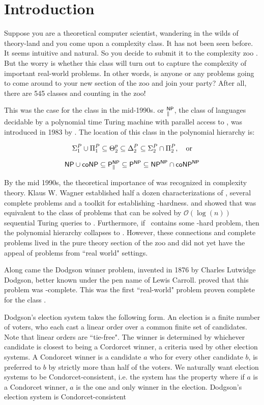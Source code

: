 \section{Introduction}\label{sec:intro}

    Suppose you are a theoretical computer scientist, wandering in the wilds
of theory-land and you come upon a complexity class.
It has not been seen before.
It seems intuitive and natural.
So you decide to submit it to the complexity zoo \citep{zoo}.
But the worry is whether this class will turn out to capture the complexity
of important real-world problems.
In other words, is anyone or any problems going to come around to your new
section of the zoo and join your party?
After all, there are 545 classes and counting
in the zoo!

This was the case for the class \tp in the mid-1990s.
\tp or $^{\mathsf{NP}}_{\parallel}$, the class of
languages decidable by a polynomial time Turing machine with parallel access to
\np, was introduced in 1983 by \citep{PZ83}.
The location of this class in the polynomial hierarchy is:


   $$\Sigma^{P}_{1} \cup \Pi^{P}_{1} \subseteq
    \Theta^{p}_2 \subseteq \Delta^{P}_2
    \subseteq \Sigma^{P}_{2} \cap \Pi^{P}_{2},~~~\text{or}$$

  $$\mathsf{NP} \cup \mathsf{coNP} \subseteq \mathsf{P}^{\mathsf{NP}}_{\parallel}
    \subseteq \mathsf{P}^{\mathsf{NP}} \subseteq \mathsf{NP}^{\mathsf{NP}} \cap \mathsf{coNP}^{\mathsf{NP}}$$


By the mid 1990s, the theoretical importance of \tp was recognized in complexity theory.
Klaus W. Wagner established half a dozen characterizations of \tp \citep{wag90},
several complete problems and a toolkit for establishing \tp-hardness.
\citet{hem87} and \citet{ksw87} showed that \tp was equivalent to the class of
problems that can be solved by $\mathcal{O}(\log(n))$ sequential Turing queries to \np.
Furthermore, if \np~contains some \tp-hard problem, then the polynomial hierarchy
collapses to \np.
However, these connections and complete problems
lived in the pure theory section of the zoo and did not yet have the appeal of
problems from ``real world" settings.

Along came the Dodgson winner problem, invented in 1876 by Charles Lutwidge
Dodgson, better known under the pen name of Lewis Carroll.
\citet{exactdodgson} proved that this problem was \tp-complete.
This was the first ``real-world" problem proven complete for the class \tp.

Dodgson's election system takes the following form.
An election is a finite number of voters, who each cast a linear order
over a common finite set of candidates.
Note that linear orders are ``tie-free".
The winner is determined by whichever candidate is closest to being a Cordorcet
winner, a criteria used by other election systems.
A Condorcet winner is a candidate $a$ who for every other candidate $b$, is
preferred to $b$ by strictly more than half of the voters.
We naturally want election systems to be Condorcet-consistent, i.e. the system
has the property where if $a$ is a Condorcet winner, $a$ is the one and only
winner in the election.
Dodgson's election system is Condorcet-consistent \citep{handbookcss}

